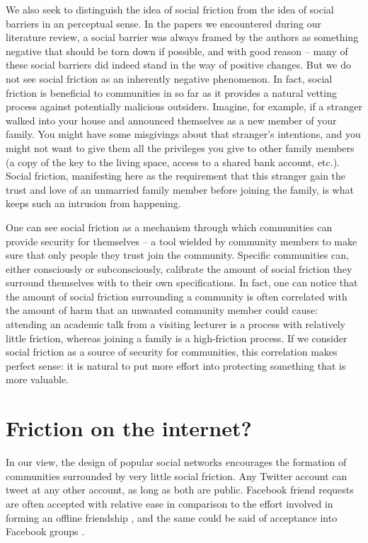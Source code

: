 \documentclass[sigconf,authordraft]{acmart}
\begin{document}
We also seek to distinguish the idea of social friction from the idea of social barriers in an perceptual sense. In the papers we encountered during our literature review, a social barrier was always framed by the authors as something negative that should be torn down if possible, and with good reason -- many of these social barriers did indeed stand in the way of positive changes. But we do not see social friction as an inherently negative phenomenon. In fact, social friction is beneficial to communities in so far as it provides a natural vetting process against potentially malicious outsiders. Imagine, for example, if a stranger walked into your house and announced themselves as a new member of your family. You might have some misgivings about that stranger's intentions, and you might not want to give them all the privileges you give to other family members (a copy of the key to the living space, access to a shared bank account, etc.). Social friction, manifesting here as the requirement that this stranger gain the trust and love of an unmarried family member before joining the family, is what keeps such an intrusion from happening. 


One can see social friction as a mechanism through which communities can provide security for themselves -- a tool wielded by community members to make sure that only people they trust join the community. Specific communities can, either consciously or subconsciously, calibrate the amount of social friction they surround themselves with to their own specifications. In fact, one can notice that the amount of social friction surrounding a community is often correlated with the amount of harm that an unwanted community member could cause: attending an academic talk from a visiting lecturer is a process with relatively little friction, whereas joining a family is a high-friction process. If we consider social friction as a source of security for communities, this correlation makes perfect sense: it is natural to put more effort into protecting something that is more valuable.

\section{Friction on the internet?}

In our view, the design of popular social networks encourages the formation of communities surrounded by very little social friction. Any Twitter account can tweet at any other account, as long as both are public. Facebook friend requests are often accepted with relative ease in comparison to the effort involved in forming an offline friendship \cite{rashtian2014befriend}, and the same could be said of acceptance into Facebook groups \cite{park2009being}. 
\end{document}
